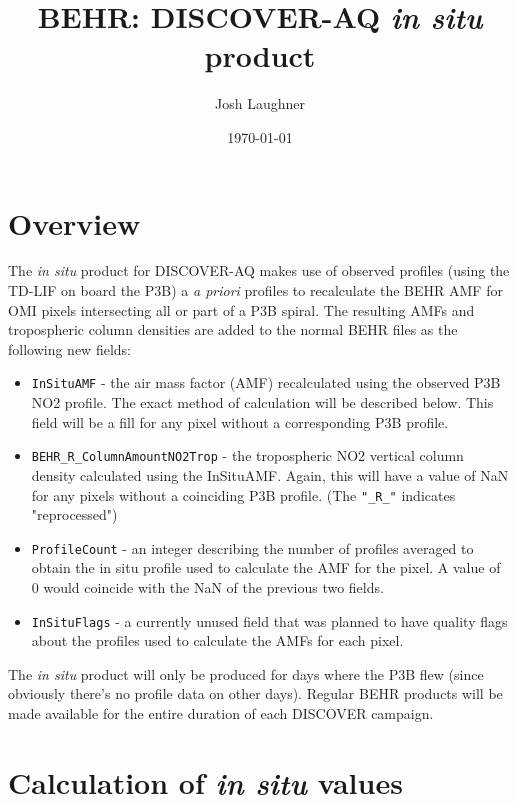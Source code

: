 \documentclass[12pt]{article}
\title{BEHR: DISCOVER-AQ \emph{in situ} product}
\author{Josh Laughner}
\date{\today}
\begin{document}
\maketitle

\section{Overview}

	The \emph{in situ} product for DISCOVER-AQ makes use of observed  profiles (using the TD-LIF on board the P3B) a \emph{a priori} profiles to recalculate the BEHR AMF for OMI pixels intersecting all or part of a P3B spiral. The resulting AMFs and tropospheric column densities are added to the normal BEHR files as the following new fields:
    
    \begin{itemize}
    
        \item \texttt{InSituAMF} - the air mass factor (AMF) recalculated using the observed
P3B NO2 profile. The exact method of calculation will be described below. This
field will be a fill for any pixel without a corresponding P3B profile.

        \item \texttt{BEHR\_R\_ColumnAmountNO2Trop} - the tropospheric NO2 vertical column
density calculated using the InSituAMF. Again, this will have a value of NaN for 
any pixels without a coinciding P3B profile. (The \texttt{"\_R\_"} indicates "reprocessed")

        \item \texttt{ProfileCount} - an integer describing the number of profiles averaged to
obtain the in situ profile used to calculate the AMF for the pixel. A value of 0
would coincide with the NaN of the previous two fields.

        \item \texttt{InSituFlags} - a currently unused field that was planned to have quality flags about the profiles used to calculate the AMFs for each pixel.

    \end{itemize}

    The \emph{in situ} product will only be produced for days where the P3B flew (since obviously there's no profile data on other days). Regular BEHR products will be made available for the entire duration of each DISCOVER campaign.
    
\section{Calculation of \emph{in situ} values}
\end{document}
